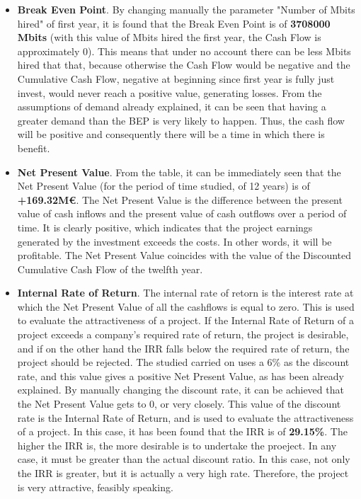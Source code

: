 \begin{itemize}
\item \textbf{Break Even Point}. By changing manually the parameter "Number of Mbits hired" of first year, it is found that the Break Even Point is of \textbf{3708000 Mbits} (with this value of Mbits hired the first year, the Cash Flow is approximately 0). This means that under no account there can be less Mbits hired that that, because otherwise the Cash Flow would be negative and the Cumulative Cash Flow, negative at beginning since first year is fully just invest, would never reach a positive value, generating losses. From the assumptions of demand already explained, it can be seen that having a greater demand than the BEP is very likely to happen. Thus, the cash flow will be positive and consequently there will be a time in which there is benefit.
\item \textbf{Net Present Value}. From the table, it can be immediately seen that the Net Present Value (for the period of time studied, of 12 years) is of \textbf{+169.32M\euro}. The Net Present Value is the difference between the present value of cash inflows and the present value of cash outflows over a period of time. It is clearly positive, which indicates that the project earnings generated by the investment exceeds the costs. In other words, it will be profitable. The Net Present Value coincides with the value of the Discounted Cumulative Cash Flow of the twelfth year. 
\item \textbf{Internal Rate of Return}. The internal rate of retorn is the interest rate at which the Net Present Value of all the cashflows is equal to zero. This is used to evaluate the attractiveness of a project. If the Internal Rate of Return of a project exceeds a company's required rate of return, the project is desirable, and if on the other hand the IRR falls below the required rate of return, the project should be rejected. The studied carried on uses a 6\% as the discount rate, and this value gives a positive Net Present Value, as has been already explained. By manually changing the discount rate, it can be achieved that the Net Present Value gets to 0, or very closely. This value of the discount rate is the Internal Rate of Return, and is used to evaluate the attractiveness of a project. In this case, it has been found that the IRR is of \textbf{29.15\%}. The higher the IRR is, the more desirable is to undertake the proeject. In any case, it must be greater than the actual discount ratio. In this case, not only the IRR is greater, but it is actually a very high rate. Therefore, the project is very attractive, feasibly speaking. 
\end{itemize}

